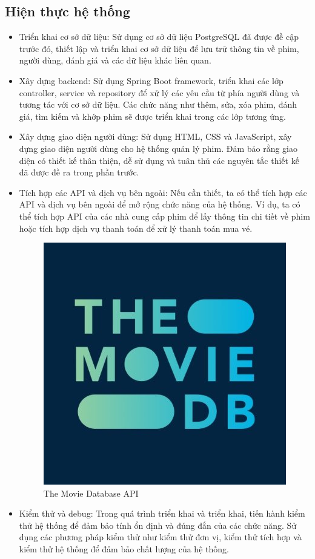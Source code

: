 \documentclass[12pt]{article}
\begin{document}
\subsection{Hiện thực hệ thống}
\begin{itemize}
    \item Triển khai cơ sở dữ liệu: Sử dụng cơ sở dữ liệu PostgreSQL đã được đề cập trước đó, thiết lập và triển khai cơ sở dữ liệu để lưu trữ thông tin về phim, người dùng, đánh giá và các dữ liệu khác liên quan.

    \item Xây dựng backend: Sử dụng Spring Boot framework, triển khai các lớp controller, service và repository để xử lý các yêu cầu từ phía người dùng và tương tác với cơ sở dữ liệu. Các chức năng như thêm, sửa, xóa phim, đánh giá, tìm kiếm và khớp phim sẽ được triển khai trong các lớp tương ứng.

    \item Xây dựng giao diện người dùng: Sử dụng HTML, CSS và JavaScript, xây dựng giao diện người dùng cho hệ thống quản lý phim. Đảm bảo rằng giao diện có thiết kế thân thiện, dễ sử dụng và tuân thủ các nguyên tắc thiết kế đã được đề ra trong phần trước.

    \item Tích hợp các API và dịch vụ bên ngoài: Nếu cần thiết, ta có thể tích hợp các API và dịch vụ bên ngoài để mở rộng chức năng của hệ thống. Ví dụ, ta có thể tích hợp API của các nhà cung cấp phim để lấy thông tin chi tiết về phim hoặc tích hợp dịch vụ thanh toán để xử lý thanh toán mua vé.
    \begin{figure}[H]
        \centering
        \includegraphics[scale=0.7]{Figs/TMDB.jpg}
        \caption{The Movie Database API}
    \end{figure}
    \item Kiểm thử và debug: Trong quá trình triển khai và triển khai, tiến hành kiểm thử hệ thống để đảm bảo tính ổn định và đúng đắn của các chức năng. Sử dụng các phương pháp kiểm thử như kiểm thử đơn vị, kiểm thử tích hợp và kiểm thử hệ thống để đảm bảo chất lượng của hệ thống.


\end{itemize}
\end{document}
